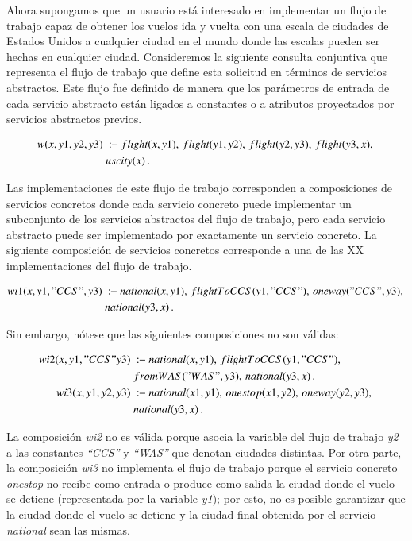 Ahora supongamos que un usuario está interesado en implementar un flujo de
trabajo capaz de obtener los vuelos ida y vuelta con una escala de ciudades de
Estados Unidos a cualquier ciudad en el mundo donde las escalas pueden ser
hechas en cualquier ciudad. Consideremos la siguiente consulta conjuntiva que
representa el flujo de trabajo que define esta solicitud en términos de
servicios abstractos. Este flujo fue definido de manera que los parámetros de
entrada de cada servicio abstracto están ligados a constantes o a
atributos proyectados por servicios abstractos previos.

\begin{alignat*}{1}
w(x,y1,y2,y3)\ &:\!\!-\ flight(x,y1),\, flight(y1,y2),\,  flight(y2,y3),\,  flight(y3,x),\,  \\
                   \ & uscity(x)\,. \\
\end{alignat*}

Las implementaciones de este flujo de trabajo corresponden a composiciones de
servicios concretos donde cada servicio concreto puede implementar un
subconjunto de los servicios abstractos del flujo de trabajo, pero cada servicio
abstracto puede ser implementado por exactamente un servicio concreto. La
siguiente composición de servicios concretos corresponde a una de las XX
implementaciones del flujo de trabajo.

\begin{alignat*}{1}
wi1(x,y1,"CCS",y3)\ &:\!\!-\ national(x,y1),\, flightToCCS(y1,"CCS"),\,  oneway("CCS",y3),\,  \\
\ & national(y3,x)\,.  \\
\end{alignat*}

Sin embargo, nótese que las siguientes composiciones no son válidas:

\begin{alignat*}{1}
wi2(x,y1,"CCS"y3)\ &:\!\!-\ national(x,y1),\, flightToCCS(y1,"CCS"),\, \\
\ & fromWAS("WAS",y3),\,  national(y3,x)\,. \\
wi3(x,y1,y2,y3)\ &:\!\!-\ national(x1,y1),\, onestop(x1,y2),\,  oneway(y2,y3),\,  \\
\ & national(y3,x)\,. \\
\end{alignat*}

La composición {\it wi2} no es válida porque asocia la variable del flujo de
trabajo {\it y2} a las constantes {\it ``CCS''} y {\it ``WAS''} que denotan
ciudades
distintas. Por otra parte, la composición {\it wi3} no implementa el flujo de
trabajo porque el servicio concreto {\it onestop} no recibe como entrada o
produce como salida la ciudad donde el vuelo se detiene (representada por la
variable {\it y1}); por esto, no es posible garantizar que la ciudad donde el
vuelo se detiene y la ciudad final obtenida por el servicio {\it national} sean
las mismas.

